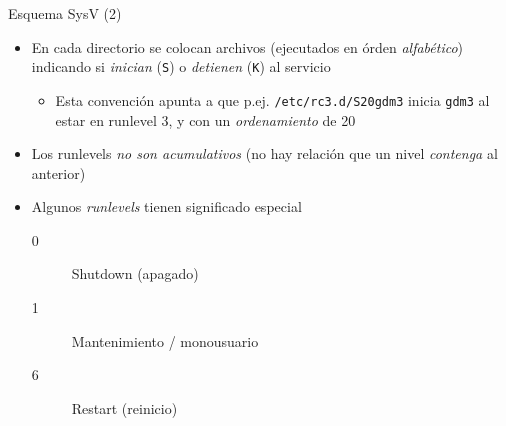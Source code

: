 \documentclass[presentation]{beamer}
\begin{document}
\begin{frame}[label={sec:orgb60e50f},fragile]{Esquema SysV (2)}
 \begin{itemize}
\item En cada directorio se colocan archivos (ejecutados en órden
\emph{alfabético}) indicando si \emph{inician} (\texttt{S}) o \emph{detienen} (\texttt{K}) al
servicio
\begin{itemize}
\item Esta convención apunta a que p.ej. \texttt{/etc/rc3.d/S20gdm3} inicia
\texttt{gdm3} al estar en runlevel 3, y con un \emph{ordenamiento} de 20
\end{itemize}
\item Los runlevels \emph{no son acumulativos} (no hay relación que un nivel
\emph{contenga} al anterior)
\item Algunos \emph{runlevels} tienen significado especial
\begin{description}
\item[{0}] Shutdown (apagado)
\item[{1}] Mantenimiento / monousuario
\item[{6}] Restart (reinicio)
\end{description}
\end{itemize}
\end{frame}
\end{document}

